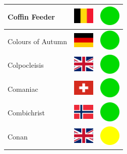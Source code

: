 \documentclass[12pt, a4paper, twoside]{report}
\begin{document}
\begin{center}
\begin{longtable}{|p{5cm}|p{2cm}|p{2cm}|}
 Coffin Feeder                                              & \includegraphics[width=1cm]{../4x3/be} &   \includegraphics[width=1cm]{../likes/y} \\ \hline
 Colours of Autumn                                          & \includegraphics[width=1cm]{../4x3/de} &   \includegraphics[width=1cm]{../likes/y} \\ \hline
 Colpocleisis                                               & \includegraphics[width=1cm]{../4x3/gb} &   \includegraphics[width=1cm]{../likes/y} \\ \hline
 Comaniac                                                   & \includegraphics[width=1cm]{../4x3/ch} &   \includegraphics[width=1cm]{../likes/y} \\ \hline
 Combichrist                                                & \includegraphics[width=1cm]{../4x3/no} &   \includegraphics[width=1cm]{../likes/y} \\ \hline
 Conan                                                      & \includegraphics[width=1cm]{../4x3/gb} &   \includegraphics[width=1cm]{../likes/m} \\ \hline

\end{longtable}
\end{center}
\end{document}
